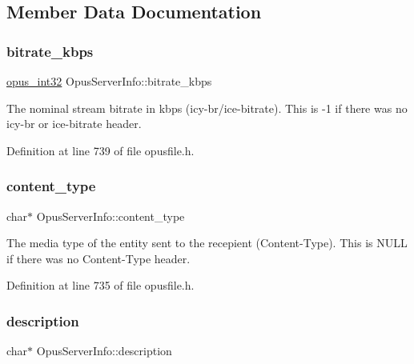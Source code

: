 \subsection{Member Data Documentation}
\mbox{\label{struct_opus_server_info_a1cf5db210f1cad5cf809bf54ddff68de}} 
\subsubsection{\texorpdfstring{bitrate\_kbps}{bitrate\_kbps}}
{\footnotesize\ttfamily \mbox{\hyperlink{opus__types_8h_aa4d309d6f80b99dbabebc8f98879ab9a}{opus\+\_\+int32}} Opus\+Server\+Info\+::bitrate\+\_\+kbps}

The nominal stream bitrate in kbps (icy-\/br/ice-\/bitrate). This is {\ttfamily -\/1} if there was no {\ttfamily icy-\/br} or {\ttfamily ice-\/bitrate} header. 

Definition at line 739 of file opusfile.\+h.

\mbox{\label{struct_opus_server_info_a5f0120b006af1122cbdc72f3cbb68fd7}} 
\subsubsection{\texorpdfstring{content\_type}{content\_type}}
{\footnotesize\ttfamily char$\ast$ Opus\+Server\+Info\+::content\+\_\+type}

The media type of the entity sent to the recepient (Content-\/\+Type). This is {\ttfamily N\+U\+LL} if there was no {\ttfamily Content-\/\+Type} header. 

Definition at line 735 of file opusfile.\+h.

\mbox{\label{struct_opus_server_info_ab16d58f0d67d6473e12629676e2641ca}} 
\subsubsection{\texorpdfstring{description}{description}}
{\footnotesize\ttfamily char$\ast$ Opus\+Server\+Info\+::description}

